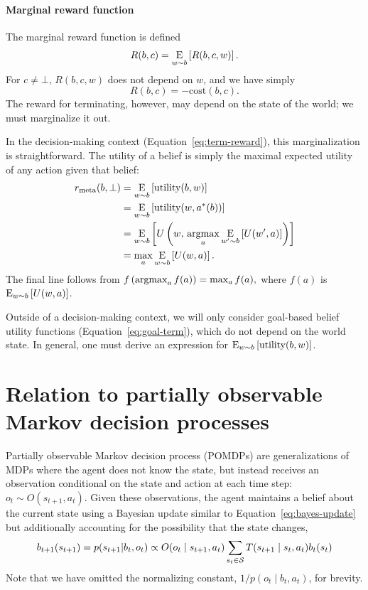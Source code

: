 \paragraph{Marginal reward function}
The marginal reward function is defined
%
\begin{equation}
R(b, c) = \expectunder{R(b, c, w)}{w \sim b}.
\end{equation}
%
For $c \neq \bot$, $R(b, c, w)$ does not depend on $w$, and we have simply
%
\begin{equation}
  R(b, c) = -\text{cost}(b, c).
\end{equation}
The reward for terminating, however, may depend on the state of the world; we must marginalize it out.

In the decision-making context (Equation~\ref{eq:term-reward}), this marginalization is straightforward. The utility of a belief is simply the maximal expected utility of any action given that belief:
%
\begin{equation}
\begin{aligned}
r\meta(b, \bot) 
&= \expectunder{\utility(b, w)}{w \sim b} \\
&= \expectunder{\utility(w, a^*(b))}{w \sim b} \\
&= \expectunder{U\left(w,\, \argmax_a \expectunder{U(w', a)}{w' \sim b}\right)}{w \sim b} \\
&= \max_a \expectunder{U(w, a)}{w \sim b}
.
\end{aligned}
\end{equation}
The final line follows from
%
\begin{math}
  f\left(\argmax_a f(a)\right) = \max_a f(a)
  ,
\end{math}
%
where $f(a)$ is $\expectunder{U(w, a)}{w \sim b}$.

Outside of a decision-making context, we will only consider goal-based belief utility functions (Equation~\ref{eq:goal-term}), which do not depend on the world state. In general, one must derive an expression for $\expectunder{\utility(b, w)}{w \sim b}$.

\section{Relation to partially observable Markov decision processes}

Partially observable Markov decision process (POMDPs) are generalizations of MDPs where the agent does not know the state, but instead receives an observation conditional on the state and action at each time step: $o_t \sim O(s_{t+1}, a_t)$. Given these observations, the agent maintains a belief about the current state using a Bayesian update similar to Equation~\ref{eq:bayes-update} but additionally accounting for the possibility that the state changes,
%
\begin{equation}\label{eq:pomdp-update}
  b_{t+1}(s_{t+1}) = p(s_{t+1} | b_t, o_t) \propto 
  O(o_t \mid s_{t+1}, a_t) \sum_{s_t \in \S} T(s_{t+1} \mid s_t, a_t) b_t(s_t)
\end{equation}
%
Note that we have omitted the normalizing constant, $1/p(o_t \mid b_t, a_t)$, for brevity.

